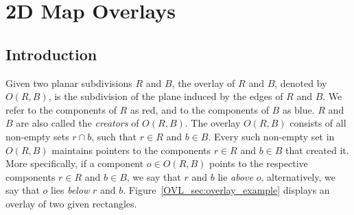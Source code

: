 



\chapter{2D Map Overlays}
\label{chap:map_overlay_2_ref}
\section{Introduction}

Given two planar subdivisions $R$ and $B$, 
the overlay of $R$ and $B$, 
denoted by $O(R,B)$, is the subdivision of the plane 
induced by the edges of $R$ and $B$.
We refer to the components of $R$ as red, 
and to the components of $B$ as blue.
$R$ and $B$ are also called the {\em creators} of $O(R,B)$.
The overlay $O(R,B)$ consists of all non-empty sets $r \cap b$, 
such that $r \in R$ and $b \in B$. 
Every such non-empty set in $O(R,B)$ maintains 
pointers to the components $r \in R$ and $b \in B$ that created it.
More specifically, if a component $o \in O(R,B)$ points 
to the respective components $r \in R$ and $b \in B$, 
we say that $r$ and $b$ lie {\em above} $o$, 
alternatively, we say that $o$ lies {\em below} $r$ and $b$.
Figure~\ref{OVL_sec:overlay_example} displays an overlay 
of two given rectangles.

